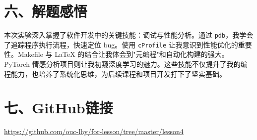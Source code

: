 \documentclass[a4paper, 12pt]{article}
\begin{document}
\section*{六、解题感悟}
本次实验深入掌握了软件开发中的关键技能：调试与性能分析。通过 \texttt{pdb}，我学会了追踪程序执行流程，快速定位 bug。使用 \texttt{cProfile} 让我意识到性能优化的重要性。Makefile 与 LaTeX 的结合让我体会到"元编程"和自动化构建的强大。PyTorch 情感分析项目则让我初窥深度学习的魅力。这些技能不仅提升了我的编程能力，也培养了系统化思维，为后续课程和项目开发打下了坚实基础。

\section*{七、GitHub链接}
\url{https://github.com/ouc-lhy/for-lesson/tree/master/lesson4}
\end{document}

